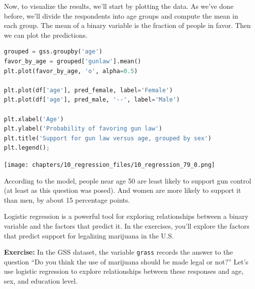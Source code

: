 Now, to visualize the results, we'll start by plotting the data. As
we've done before, we'll divide the respondents into age groups and
compute the mean in each group. The mean of a binary variable is the
fraction of people in favor. Then we can plot the predictions.

\begin{lstlisting}[language=Python,style=source]
grouped = gss.groupby('age')
favor_by_age = grouped['gunlaw'].mean()
plt.plot(favor_by_age, 'o', alpha=0.5)

plt.plot(df['age'], pred_female, label='Female')
plt.plot(df['age'], pred_male, '--', label='Male')

plt.xlabel('Age')
plt.ylabel('Probability of favoring gun law')
plt.title('Support for gun law versus age, grouped by sex')
plt.legend();
\end{lstlisting}

\begin{center}
\texttt{[image: chapters/10\_regression\_files/10\_regression\_79\_0.png]}
\end{center}

According to the model, people near age 50 are least likely to support
gun control (at least as this question was posed). And women are more
likely to support it than men, by about 15 percentage points.

Logistic regression is a powerful tool for exploring relationships
between a binary variable and the factors that predict it. In the
exercises, you'll explore the factors that predict support for
legalizing marijuana in the U.S.

\textbf{Exercise:} In the GSS dataset, the variable
\passthrough{\lstinline!grass!} records the answer to the question ``Do
you think the use of marijuana should be made legal or not?'' Let's use
logistic regression to explore relationships between these responses and
age, sex, and education level.

